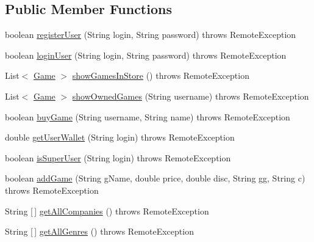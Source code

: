 \subsection*{Public Member Functions}
\begin{DoxyCompactItemize}
\item 
boolean \hyperlink{interfacees_1_1deusto_1_1server_1_1remote_1_1_i_remote_aea9a185d69da02d134443a3802a20b32}{register\+User} (String login, String password)  throws Remote\+Exception
\item 
boolean \hyperlink{interfacees_1_1deusto_1_1server_1_1remote_1_1_i_remote_a19acdbd6565b0f00cbe860a3316071ad}{login\+User} (String login, String password)  throws Remote\+Exception
\item 
List$<$ \hyperlink{classes_1_1deusto_1_1server_1_1db_1_1data_1_1_game}{Game} $>$ \hyperlink{interfacees_1_1deusto_1_1server_1_1remote_1_1_i_remote_a091249da31b567c1be29e07085d3ff18}{show\+Games\+In\+Store} ()  throws Remote\+Exception
\item 
List$<$ \hyperlink{classes_1_1deusto_1_1server_1_1db_1_1data_1_1_game}{Game} $>$ \hyperlink{interfacees_1_1deusto_1_1server_1_1remote_1_1_i_remote_aaaf6af5906c81cbd7b3b190a70ead98b}{show\+Owned\+Games} (String username)  throws Remote\+Exception
\item 
boolean \hyperlink{interfacees_1_1deusto_1_1server_1_1remote_1_1_i_remote_ad2e6ee616bdc780b4057e63bf2ae8be7}{buy\+Game} (String username, String name)  throws Remote\+Exception
\item 
double \hyperlink{interfacees_1_1deusto_1_1server_1_1remote_1_1_i_remote_a53305dbc72d910c932e66e2c27c5e1bb}{get\+User\+Wallet} (String login)  throws Remote\+Exception
\item 
boolean \hyperlink{interfacees_1_1deusto_1_1server_1_1remote_1_1_i_remote_a488f8b57271876e219af445345428d73}{is\+Super\+User} (String login)  throws Remote\+Exception
\item 
boolean \hyperlink{interfacees_1_1deusto_1_1server_1_1remote_1_1_i_remote_a991909db4d26d5be67bb3e0bcb501c7e}{add\+Game} (String g\+Name, double price, double disc, String gg, String c)  throws Remote\+Exception
\item 
String \mbox{[}$\,$\mbox{]} \hyperlink{interfacees_1_1deusto_1_1server_1_1remote_1_1_i_remote_a43ab8347d64e5d49093e607029f2598b}{get\+All\+Companies} ()  throws Remote\+Exception
\item 
String \mbox{[}$\,$\mbox{]} \hyperlink{interfacees_1_1deusto_1_1server_1_1remote_1_1_i_remote_a7c3721ee532d20aa65b892b55f157b21}{get\+All\+Genres} ()  throws Remote\+Exception
\end{DoxyCompactItemize}



